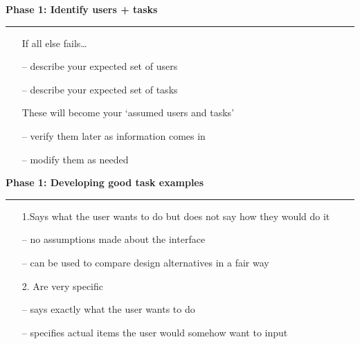 \documentclass[pdf]{beamer}
\begin{document}
\begin{frame}
\vspace{8mm}
\textcolor{myBlue}{\textbf{\Large{Phase 1: Identify users + tasks}}}

\textcolor{red}{\rule{10cm}{1mm}}	

\begin{itemize}
	\item[]  {\LARGE If all else fails…} \newline
	 \item[\textcolor{black}{--}]describe your expected set of users
     \item[\textcolor{black}{--}]describe your expected set of tasks
\end{itemize}
\begin{itemize}
	\item[]  {\LARGE These will become your ‘assumed users and tasks’} \newline
	 \item[\textcolor{black}{--}]verify them later as information comes in
     \item[\textcolor{black}{--}]modify them as needed
\end{itemize}

\end{frame}



\begin{frame}
\vspace{8mm}
\textcolor{myBlue}{\textbf{\Large{Phase 1: Developing good task examples}}}

\textcolor{red}{\rule{10cm}{1mm}}	

\begin{itemize}
	\item[]  {\LARGE 1.Says what the user wants to do but does not say how they would do it} \newline
	 \item[\textcolor{black}{--}]no assumptions made about the interface
     \item[\textcolor{black}{--}]can be used to compare design alternatives in a fair way
\end{itemize}
\begin{itemize}
	\item[]  {\LARGE 2. Are very specific} \newline
	 \item[\textcolor{black}{--}]says exactly what the user wants to do
     \item[\textcolor{black}{--}]specifies actual items the user would somehow want to input
\end{itemize}

\end{frame}
\end{document}
